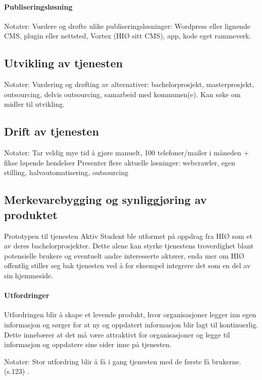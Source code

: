 \paragraph{Publiseringsløsning}
Notater:
Vurdere og drøfte ulike publiseringsløsninger: Wordpress eller lignende CMS, plugin eller nettsted, Vortex (HIØ sitt CMS), app, kode eget rammeverk.

\subsection{Utvikling av tjenesten}
Notater:
Vurdering og drøfting av alternativer: bachelorprosjekt, masterprosjekt, outsourcing, delvis outsourcing, samarbeid med kommunen(e).
Kan søke om midler til utvikling.

\subsection{Drift av tjenesten}
Notater: 
Tar veldig mye tid å gjøre manuelt, 100 telefoner/mailer i måneden + fikse løpende hendelser
Presenter flere aktuelle løsninger: webcrawler, egen stilling, halvautomatisering, outsourcing

\subsection{Merkevarebygging og synliggjøring av produktet}
Prototypen til tjenesten Aktiv Student ble utformet på oppdrag fra HIØ som et av deres bachelorprosjekter. Dette alene kan styrke tjenestens troverdighet blant potensielle brukere og eventuelt andre interesserte aktører, enda mer om HIØ offentlig stiller seg bak tjenesten ved å for eksempel integrere det som en del av sin hjemmeside.

\paragraph{Utfordringer}
Utfordringen blir å skape et levende produkt, hvor organisasjoner legger inn egen informasjon og sørger for at ny og oppdatert informasjon blir lagt til kontinuerlig. Dette innebærer at det må være attraktivt for organisasjoner og legge til informasjon og oppdatere sine sider inne på tjenesten.

Notater:
Stor utfordring blir å få i gang tjenesten med de første få brukerne.  (s.123) \cite{INTERACTIVE-DESIGN:19}.

